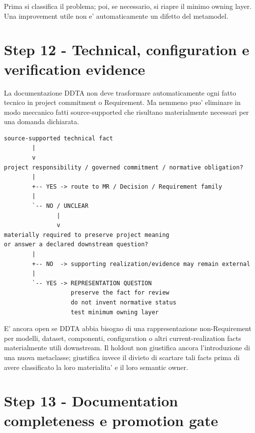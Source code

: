 \documentclass[11pt,a4paper]{article}
\begin{document}
\begin{ddtaprinciple}
Prima si classifica il problema; poi, se necessario, si riapre il minimo owning layer. Una improvement utile non e' automaticamente un difetto del metamodel.
\end{ddtaprinciple}

\section{Step 12 - Technical, configuration e verification evidence}
\holdouttag

La documentazione DDTA non deve trasformare automaticamente ogni fatto tecnico in project commitment o Requirement. Ma nemmeno puo' eliminare in modo meccanico fatti source-supported che risultano materialmente necessari per una domanda dichiarata.

\begin{lstlisting}
source-supported technical fact
        |
        v
project responsibility / governed commitment / normative obligation?
        |
        +-- YES -> route to MR / Decision / Requirement family
        |
        `-- NO / UNCLEAR
               |
               v
materially required to preserve project meaning
or answer a declared downstream question?
        |
        +-- NO  -> supporting realization/evidence may remain external
        |
        `-- YES -> REPRESENTATION QUESTION
                   preserve the fact for review
                   do not invent normative status
                   test minimum owning layer
\end{lstlisting}

\begin{ddtaopen}[title={MIP - source-supported technical realization preservation}]
E' ancora open se DDTA abbia bisogno di una rappresentazione non-Requirement per modelli, dataset, componenti, configuration o altri current-realization facts materialmente utili downstream. Il holdout non giustifica ancora l'introduzione di una nuova metaclasse; giustifica invece il divieto di scartare tali facts prima di avere classificato la loro materialita' e il loro semantic owner.
\end{ddtaopen}

\section{Step 13 - Documentation completeness e promotion gate}
\closedtag
\end{document}
